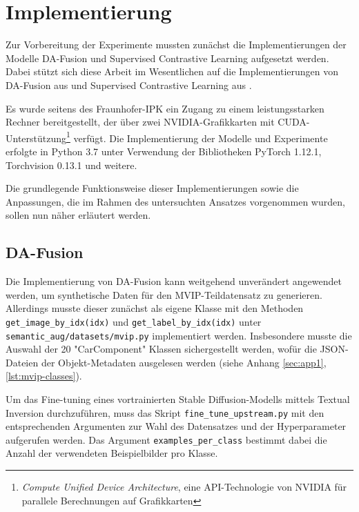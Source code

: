 \section{Implementierung} \label{sec:implementation}

Zur Vorbereitung der Experimente mussten zunächst die Implementierungen der Modelle DA-Fusion und Supervised Contrastive Learning aufgesetzt werden. Dabei stützt sich diese Arbeit im Wesentlichen auf die Implementierungen von DA-Fusion aus \parencite{Trabucco2024dafusiongithub} und Supervised Contrastive Learning aus \parencite{Tian2023supcongithub}.

Es wurde seitens des Fraunhofer-IPK ein Zugang zu einem leistungsstarken Rechner bereitgestellt, der über zwei NVIDIA-Grafikkarten mit CUDA-Unterstützung\footnote{\textit{Compute Unified Device Architecture}, eine API-Technologie von NVIDIA für parallele Berechnungen auf Grafikkarten} verfügt. Die Implementierung der Modelle und Experimente erfolgte in Python 3.7 unter Verwendung der Bibliotheken PyTorch 1.12.1, Torchvision 0.13.1 und weitere.

Die grundlegende Funktionsweise dieser Implementierungen sowie die Anpassungen, die im Rahmen des untersuchten Ansatzes vorgenommen wurden, sollen nun näher erläutert werden.

\subsection{DA-Fusion} \label{subsec:da-fusion-implementation}

Die Implementierung von DA-Fusion kann weitgehend unverändert angewendet werden, um synthetische Daten für den MVIP-Teildatensatz zu generieren. Allerdings musste dieser zunächst als eigene Klasse mit den Methoden \lstinline{get_image_by_idx(idx)} und \lstinline{get_label_by_idx(idx)} unter \lstinline{semantic_aug/datasets/mvip.py} implementiert werden. Insbesondere musste die Auswahl der 20 "CarComponent" Klassen sichergestellt werden, wofür die JSON-Dateien der Objekt-Metadaten ausgelesen werden (siehe Anhang \ref{sec:app1}, \autoref{lst:mvip-classes}). %

Um das Fine-tuning eines vortrainierten Stable Diffusion-Modells mittels Textual Inversion durchzuführen, muss das Skript \lstinline{fine_tune_upstream.py} mit den entsprechenden Argumenten zur Wahl des Datensatzes und der Hyperparameter aufgerufen werden. Das Argument \lstinline{examples_per_class} bestimmt dabei die Anzahl der verwendeten Beispielbilder pro Klasse.

